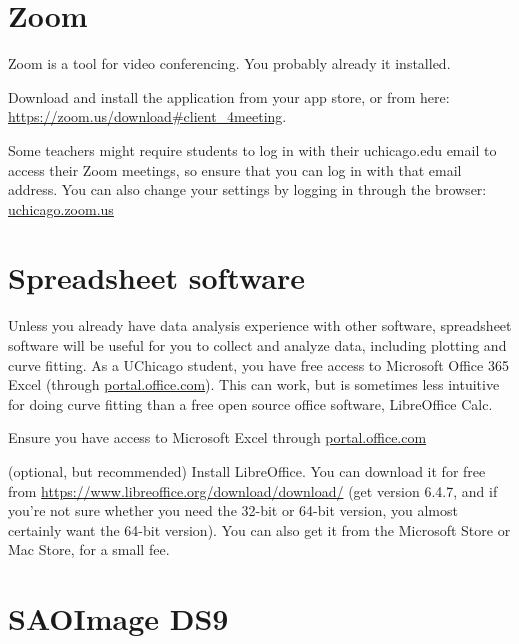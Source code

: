 \section{Zoom}

Zoom is a tool for video conferencing. You probably already it installed.

\begin{steps}
	\item Download and install the application from your app store, or from here: \url{https://zoom.us/download\#client_4meeting}.
	
	\item Some teachers might require students to log in with their uchicago.edu email to access their Zoom meetings, so ensure that you can log in with that email address. You can also change your settings by logging in through the browser: \url{uchicago.zoom.us}
\end{steps}

\section{Spreadsheet software}

Unless you already have data analysis experience with other software, spreadsheet software will be useful for you to collect and analyze data, including plotting and curve fitting. As a UChicago student, you have free access to Microsoft Office 365 Excel (through \url{portal.office.com}). This can work, but is sometimes less intuitive for doing curve fitting than a free open source office software, LibreOffice Calc.

\begin{steps}
	\item Ensure you have access to Microsoft Excel through \url{portal.office.com}
	
	\item (optional, but recommended) Install LibreOffice. You can download it for free from \url{https://www.libreoffice.org/download/download/} (get version 6.4.7, and if you're not sure whether you need the 32-bit or 64-bit version, you almost certainly want the 64-bit version). You can also get it from the Microsoft Store or Mac Store, for a small fee.
\end{steps}

\section{SAOImage DS9}


